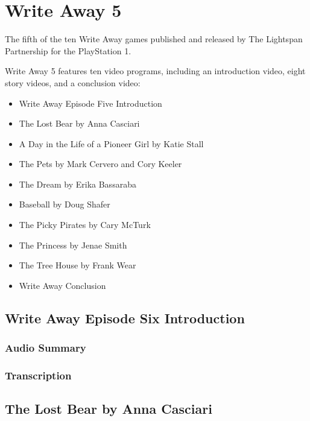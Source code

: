 \chapter{Write Away 5}


The fifth of the ten Write Away games published and released by The Lightspan Partnership for the PlayStation 1.

Write Away 5 features ten video programs, including an introduction video, eight story videos, and a conclusion video:

\begin{itemize}
    \item Write Away Episode Five Introduction
    \item The Lost Bear by Anna Casciari
    \item A Day in the Life of a Pioneer Girl by Katie Stall
    \item The Pets by Mark Cervero and Cory Keeler
    \item The Dream by Erika Bassaraba
    \item Baseball by Doug Shafer
    \item The Picky Pirates by Cary McTurk
    \item The Princess by Jenae Smith
    \item The Tree House by Frank Wear
    \item Write Away Conclusion
\end{itemize}

\clearpage
\newpage

\section{Write Away Episode Six Introduction}

\subsection{Audio Summary}

\subsection{Transcription}

\section{The Lost Bear by Anna Casciari}

